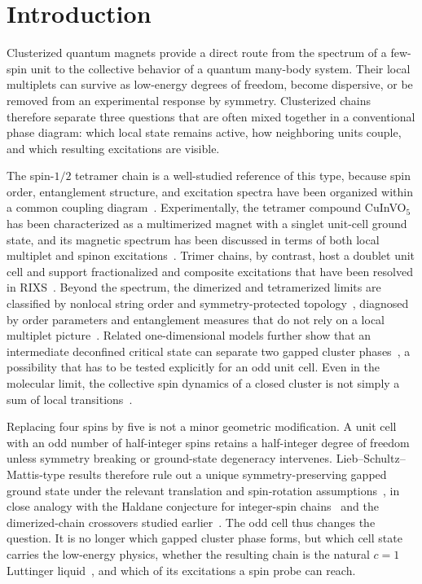\section{Introduction}
\label{sec:introduction}

Clusterized quantum magnets provide a direct route from the spectrum of a
few-spin unit to the collective behavior of a quantum many-body system.
Their local multiplets can survive as low-energy degrees of freedom, become
dispersive, or be removed from an experimental response by symmetry.
Clusterized chains therefore separate three questions that are often mixed
together in a conventional phase diagram: which local state remains active, how
neighboring units couple, and which resulting excitations are visible.

The spin-$1/2$ tetramer chain is a well-studied reference of this type, because
spin order, entanglement structure, and excitation spectra have been organized
within a common coupling diagram~\cite{li2026tetramer,gong2008tetramer}.
Experimentally, the tetramer compound CuInVO$_5$ has been characterized as a
multimerized magnet with a singlet unit-cell ground state, and its magnetic
spectrum has been discussed in terms of both local multiplet and spinon
excitations~\cite{hase2016cuinvo5,reja2019cuinvo5,singhania2018}.
Trimer chains, by contrast, host a doublet unit cell and support fractionalized
and composite excitations that have been resolved in
RIXS~\cite{cheng2022trimer,cheng2024trimerfield,li2025rixstrimer,prabhakar2025trimer,bera2022trimer}.
Beyond the spectrum, the dimerized and tetramerized limits are classified by
nonlocal string order and symmetry-protected
topology~\cite{guwen2009,pollmann2010,pollmann2012,han2017bcfg,ma2023aspt},
diagnosed by order parameters and entanglement measures that do not rely on a
local multiplet picture~\cite{hung2015,lu2020,scheie2021}.
Related one-dimensional models further show that an intermediate deconfined
critical state can separate two gapped cluster
phases~\cite{jiang2019dqcp,roberts2019dqcp,huang2019dqcp,yang2021dqcp}, a
possibility that has to be tested explicitly for an odd unit cell.
Even in the molecular limit, the collective spin dynamics of a closed cluster is
not simply a sum of local transitions~\cite{ummethum2012}.

Replacing four spins by five is not a minor geometric modification.
A unit cell with an odd number of half-integer spins retains a half-integer
degree of freedom unless symmetry breaking or ground-state degeneracy
intervenes.
Lieb--Schultz--Mattis-type results therefore rule out a unique
symmetry-preserving gapped ground state under the relevant translation and
spin-rotation assumptions~\cite{lieb1961,ogata2019,affleck1987}, in close analogy
with the Haldane conjecture for integer-spin chains~\cite{haldane1983} and the
dimerized-chain crossovers studied earlier~\cite{hida1992,chitra1995}.
The odd cell thus changes the question.
It is no longer which gapped cluster phase forms, but which cell state carries the
low-energy physics, whether the resulting chain is the natural $c=1$ Luttinger
liquid~\cite{giamarchi2003,calabrese2004}, and which of its excitations a spin
probe can reach.

